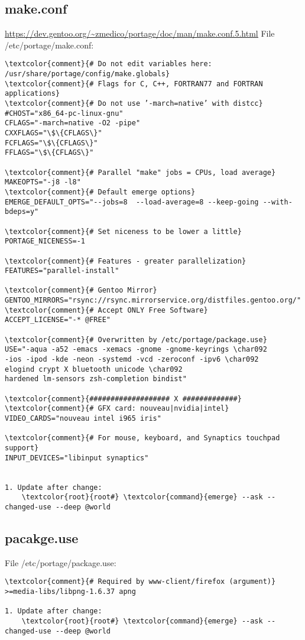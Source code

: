 \documentclass[10pt, a4paper, onecolumn, openany]{book}         %
\begin{document}
\subsection{make.conf}
\label{make.conf}
\underline{\url{https://dev.gentoo.org/~zmedico/portage/doc/man/make.conf.5.html}}\newline
File \textcolor{file}{/etc/portage/make.conf}:
\begin{Verbatim}[commandchars=\\\{\}]
\textcolor{comment}{# Do not edit variables here: /usr/share/portage/config/make.globals}
\textcolor{comment}{# Flags for C, C++, FORTRAN77 and FORTRAN applications}
\textcolor{comment}{# Do not use ’-march=native’ with distcc}
#CHOST="x86_64-pc-linux-gnu"
CFLAGS="-march=native -O2 -pipe"
CXXFLAGS="\$\{CFLAGS\}"
FCFLAGS="\$\{CFLAGS\}"
FFLAGS="\$\{CFLAGS\}"

\textcolor{comment}{# Parallel "make" jobs = CPUs, load average}
MAKEOPTS="-j8 -l8" 
\textcolor{comment}{# Default emerge options}
EMERGE_DEFAULT_OPTS="--jobs=8  --load-average=8 --keep-going --with-bdeps=y"

\textcolor{comment}{# Set niceness to be lower a little}
PORTAGE_NICENESS=-1

\textcolor{comment}{# Features - greater parallelization}
FEATURES="parallel-install"

\textcolor{comment}{# Gentoo Mirror}
GENTOO_MIRRORS="rsync://rsync.mirrorservice.org/distfiles.gentoo.org/"
\textcolor{comment}{# Accept ONLY Free Software}
ACCEPT_LICENSE="-* @FREE"

\textcolor{comment}{# Overwritten by /etc/portage/package.use}
USE="-aqua -a52 -emacs -xemacs -gnome -gnome-keyrings \char092
-ios -ipod -kde -neon -systemd -vcd -zeroconf -ipv6 \char092
elogind crypt X bluetooth unicode \char092
hardened lm-sensors zsh-completion bindist"

\textcolor{comment}{################### X #############}
\textcolor{comment}{# GFX card: nouveau|nvidia|intel}
VIDEO_CARDS="nouveau intel i965 iris"

\textcolor{comment}{# For mouse, keyboard, and Synaptics touchpad support}
INPUT_DEVICES="libinput synaptics"


1. Update after change:
    \textcolor{root}{root#} \textcolor{command}{emerge} --ask --changed-use --deep @world
\end{Verbatim}


\subsection{pacakge.use}
\label{package.use}
File \textcolor{file}{/etc/portage/package.use}:
\begin{Verbatim}[commandchars=\\\{\}]
\textcolor{comment}{# Required by www-client/firefox (argument)}
>=media-libs/libpng-1.6.37 apng

1. Update after change:
    \textcolor{root}{root#} \textcolor{command}{emerge} --ask --changed-use --deep @world
\end{Verbatim}
\end{document}
